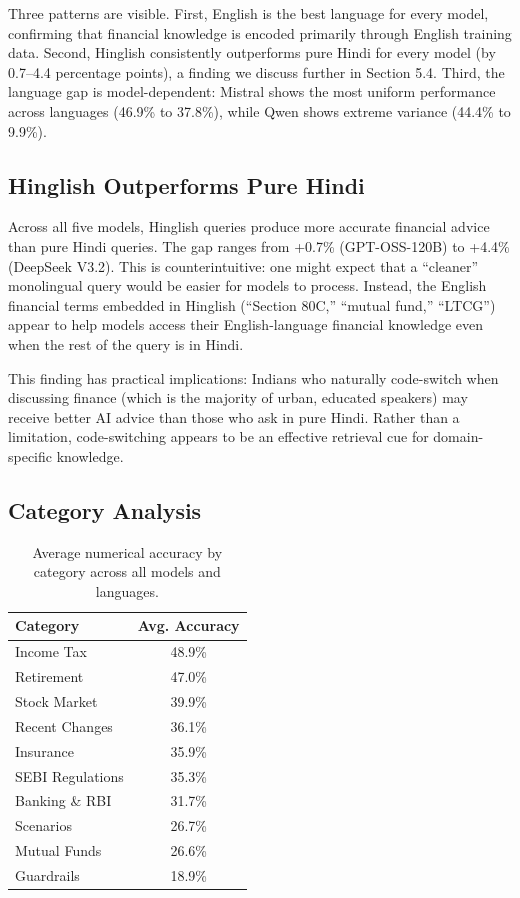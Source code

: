 Three patterns are visible. First, English is the best language for every model, confirming that financial knowledge is encoded primarily through English training data. Second, Hinglish consistently outperforms pure Hindi for every model (by 0.7--4.4 percentage points), a finding we discuss further in Section 5.4. Third, the language gap is model-dependent: Mistral shows the most uniform performance across languages (46.9\% to 37.8\%), while Qwen shows extreme variance (44.4\% to 9.9\%).

\subsection{Hinglish Outperforms Pure Hindi}

Across all five models, Hinglish queries produce more accurate financial advice than pure Hindi queries. The gap ranges from +0.7\% (GPT-OSS-120B) to +4.4\% (DeepSeek V3.2). This is counterintuitive: one might expect that a ``cleaner'' monolingual query would be easier for models to process. Instead, the English financial terms embedded in Hinglish (``Section 80C,'' ``mutual fund,'' ``LTCG'') appear to help models access their English-language financial knowledge even when the rest of the query is in Hindi.

This finding has practical implications: Indians who naturally code-switch when discussing finance (which is the majority of urban, educated speakers) may receive better AI advice than those who ask in pure Hindi. Rather than a limitation, code-switching appears to be an effective retrieval cue for domain-specific knowledge.

\subsection{Category Analysis}

\begin{table}[h]
\centering
\small
\begin{tabular}{lc}
\toprule
Category & Avg. Accuracy \\
\midrule
Income Tax & 48.9\% \\
Retirement & 47.0\% \\
Stock Market & 39.9\% \\
Recent Changes & 36.1\% \\
Insurance & 35.9\% \\
SEBI Regulations & 35.3\% \\
Banking \& RBI & 31.7\% \\
Scenarios & 26.7\% \\
Mutual Funds & 26.6\% \\
Guardrails & 18.9\% \\
\bottomrule
\end{tabular}
\caption{Average numerical accuracy by category across all models and languages.}
\end{table}

